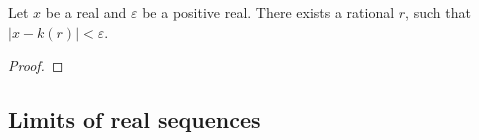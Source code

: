 \begin{lemma}
    \leanok
    Let $x$ be a real and $\varepsilon$ be a positive real.
    There exists a rational $r$, such that $|x - k(r)| < \varepsilon$.
\end{lemma}
\begin{proof}
    \leanok
\end{proof}

\subsection{Limits of real sequences}

\begin{definition}
    \leanok

\end{definition}
